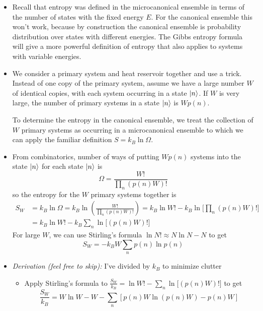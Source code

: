\documentclass[11pt, a4paper]{article}
\begin{document}
\begin{itemize}
	\item Recall that entropy was defined in the microcanonical ensemble in terms of the number of states with the fixed energy $ E $. For the canonical ensemble this won't work, because by construction the canonical ensemble is probability distribution over states with different energies. The Gibbs entropy formula will give a more powerful definition of entropy that also applies to systems with variable energies.
	
	\item We consider a primary system and heat reservoir together and use a trick. Instead of one copy of the primary system, assume we have a large number $ W $ of identical copies, with each system occurring in a state $ \ket{n} $. If $ W $ is very large, the number of primary systems in a state $ \ket{n} $ is $ W p(n) $.
	
	To determine the entropy in the canonical ensemble, we treat the collection of $ W $ primary systems as occurring in a microcanonical ensemble to which we can apply the familiar definition $ S = k_{B} \ln \Omega$. 
	
	\item From combinatorics, number of ways of putting $ W p(n) $ systems into the state $ \ket{n} $ for each state $ \ket{n} $ is
	\begin{equation*}
		\Omega = \frac{W!}{\prod_{n}(p(n)W)!}
	\end{equation*}
	so the entropy for the $ W $ primary systems together is
	\begin{align*}
		S_{W} &= k_{B} \ln \Omega = k_{B}\ln(\frac{W!}{\prod_{n}(p(n)W)!})=k_{B}\ln W! - k_{B}\ln  \big[\textstyle \prod_{n}(p(n)W)! \big]\\
		&=k_{B}\ln W! - k_{B} \sum_{n} \ln\big[(p(n)W)!\big]
	\end{align*}
	For large $ W $, we can use Stirling's formula $ \ln N! \approx N \ln N - N $ to get
	\begin{equation*}
		S_{W} = - k_{B} W \sum_{n}p(n)\ln p(n)
	\end{equation*}
	
	\item \textit{Derivation (feel free to skip):} I've divided by $ k_{B} $ to minimize clutter
	\begin{itemize}
		\item Apply Stirling's formula to $ \frac{S_{W}}{k_{B}} = \ln W! - \sum_{n} \ln\big[(p(n)W)!\big] $ to get
		\begin{equation*}
			\frac{S_{W}}{k_{B}} = W \ln W - W - \sum_{n}\left[p(n)W \ln (p(n)W) -p(n)W \right]
		\end{equation*}
	

\end{itemize}
\end{itemize}
\end{document}
